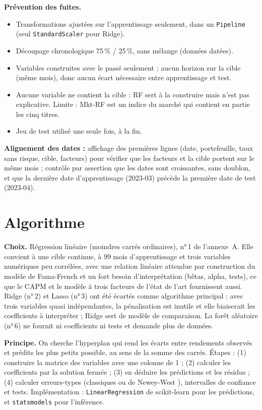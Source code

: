 \documentclass[11pt,a4paper]{article}
\newcommand{\mkt}{Mkt-RF}
\begin{document}
\textbf{Prévention des fuites.}
\begin{itemize}[leftmargin=1.2cm,label=$\checkmark$]
\item Transformations ajustées sur l'apprentissage seulement, dans un \texttt{Pipeline} (seul \texttt{StandardScaler} pour Ridge).
\item Découpage chronologique 75\,\% / 25\,\%, sans mélange (données datées).
\item Variables construites avec le passé seulement ; aucun horizon sur la cible (même mois), donc aucun écart nécessaire entre apprentissage et test.
\item Aucune variable ne contient la cible : RF sert à la construire mais n'est pas explicative. Limite : \mkt{} est un indice du marché qui contient en partie les cinq titres.
\item Jeu de test utilisé une seule fois, à la fin.
\end{itemize}

\textbf{Alignement des dates :} affichage des premières lignes (date, portefeuille, taux sans risque, cible, facteurs) pour vérifier que les facteurs et la cible portent sur le même mois ; contrôle par assertion que les dates sont croissantes, sans doublon, et que la dernière date d'apprentissage (2023-03) précède la première date de test (2023-04).

\section{Algorithme}

\textbf{Choix.} Régression linéaire (moindres carrés ordinaires), n°\,1 de l'annexe~A. Elle convient à une cible continue, à 99 mois d'apprentissage et trois variables numériques peu corrélées, avec une relation linéaire attendue par construction du modèle de Fama-French et un fort besoin d'interprétation (bêtas, alpha, tests), ce que le CAPM et le modèle à trois facteurs de l'état de l'art \cite{sharpe,ff93} fournissent aussi. Ridge (n°\,2) et Lasso (n°\,3) ont été écartés comme algorithme principal : avec trois variables quasi indépendantes, la pénalisation est inutile et elle biaiserait les coefficients à interpréter ; Ridge sert de modèle de comparaison. La forêt aléatoire (n°\,6) ne fournit ni coefficients ni tests et demande plus de données.

\textbf{Principe.} On cherche l'hyperplan qui rend les écarts entre rendements observés et prédits les plus petits possible, au sens de la somme des carrés. Étapes : (1) construire la matrice des variables avec une colonne de 1 ; (2) calculer les coefficients par la solution fermée ; (3) en déduire les prédictions et les résidus ; (4) calculer erreurs-types (classiques ou de Newey-West \cite{newey}), intervalles de confiance et tests. Implémentation : \texttt{LinearRegression} de scikit-learn \cite{sklearn} pour les prédictions, et \texttt{statsmodels} pour l'inférence.
\end{document}
